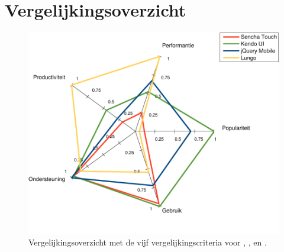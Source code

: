 \section{Vergelijkingsoverzicht}
\label{sec:evaluatie-spinnenweb}


\begin{figure}[H]
  \centering
  \includegraphics[width=\textwidth]{figuren/spidergraph-initial.pdf}
  \caption{Vergelijkingsoverzicht met de vijf vergelijkingscriteria voor \st{},  \kendo{},  \jqm{} en \lungo{}.}
  \label{fig:spinnenweb-initial}
\end{figure}




